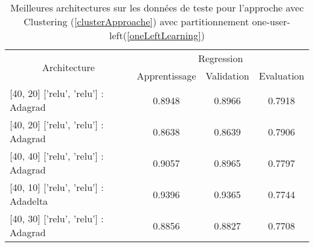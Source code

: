 \begin{table}[H]
	\centering
	\begin{tabular}{|l|c|c|c|}
		\hline
		\multicolumn{1}{|c|}{\multirow{2}{*}{Architecture}}                   & \multicolumn{3}{c|}{Regression}         \\ \cline{2-4} 
		\multicolumn{1}{|c|}{}                                                & Apprentissage & Validation & Evaluation \\ \hline
		{[}40, 20{]} {[}'relu', 'relu'{]} : Adagrad  & 0.8948        & 0.8966     & 0.7918     \\ \hline
		{[}40, 20{]} {[}'relu', 'relu'{]} : Adagrad  & 0.8638        & 0.8639     & 0.7906     \\ \hline
		{[}40, 40{]} {[}'relu', 'relu'{]} : Adagrad  & 0.9057        & 0.8965     & 0.7797     \\ \hline
		{[}40, 10{]} {[}'relu', 'relu'{]} : Adadelta & 0.9396        & 0.9365     & 0.7744     \\ \hline
		{[}40, 30{]} {[}'relu', 'relu'{]} : Adagrad  & 0.8856        & 0.8827     & 0.7708     \\ \hline
	\end{tabular}
	\caption{Meilleures architectures sur les données de teste pour l'approche avec Clustering (\ref{clusterApproache}) avec partitionnement one-user-left(\ref{oneLeftLearning})}
\end{table}